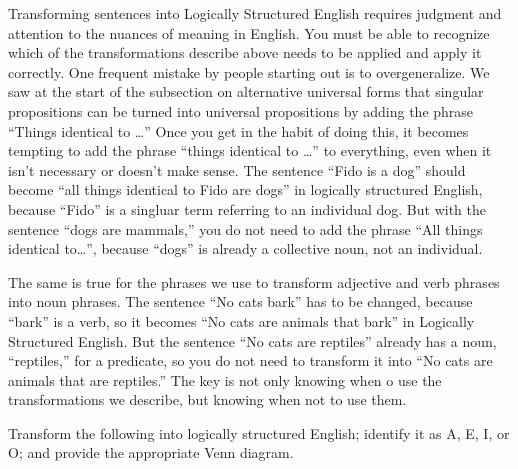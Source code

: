 Transforming sentences into Logically Structured English requires judgment and attention to the nuances of meaning in English. You must be able to recognize which of the transformations describe above needs to be applied and apply it correctly. One frequent mistake by people starting out is to overgeneralize. We saw at the start of the subsection on alternative universal forms that singular propositions can be turned into universal propositions by adding the phrase ``Things identical to \ldots'' Once you get in the habit of doing this, it becomes tempting to add the phrase ``things identical to \ldots'' to everything, even when it isn't necessary or doesn't make sense. The sentence ``Fido is a dog'' should become ``all things identical to Fido are dogs'' in logically structured English, because ``Fido'' is a singluar term referring to an individual dog. But with the sentence ``dogs are mammals,'' you do not need to add the phrase ``All things identical to\ldots'', because ``dogs'' is already a collective noun, not an individual.   

The same is true for the phrases we use to transform adjective and verb phrases into noun phrases. The sentence ``No cats bark'' has to be changed, because ``bark'' is a verb, so it becomes ``No cats are animals that bark'' in Logically Structured English. But the sentence ``No cats are reptiles'' already has a noun, ``reptiles,'' for a predicate, so you do not need to transform it into ``No cats are animals that are reptiles.'' The key is not only knowing when o use the transformations we describe, but knowing when not to use them. 



\practiceproblems
\noindent\problempart Transform the following into logically structured English; identify it as A, E, I, or O; and provide the appropriate Venn diagram.


